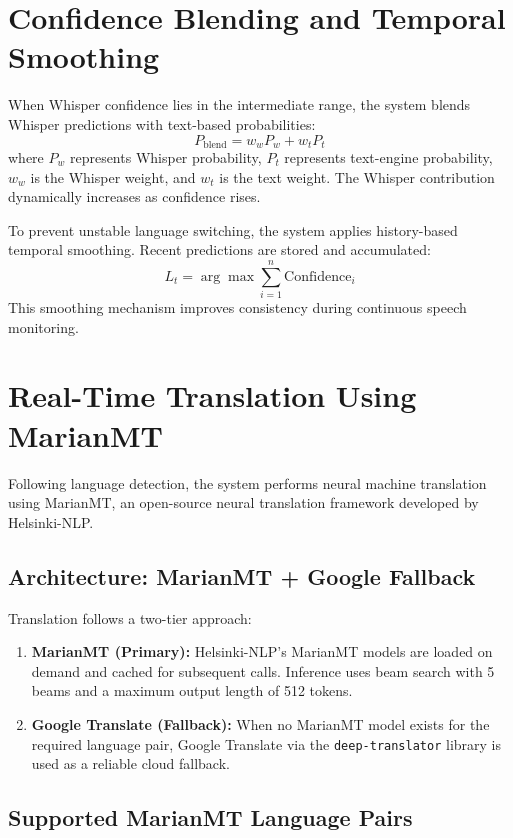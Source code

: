 \documentclass[12pt]{report}
\begin{document}
\section{Confidence Blending and Temporal Smoothing}

When Whisper confidence lies in the intermediate range, the system blends Whisper predictions with text-based probabilities:
\[
P_{\text{blend}} = w_w P_w + w_t P_t
\]
where $P_w$ represents Whisper probability, $P_t$ represents text-engine probability, $w_w$ is the Whisper weight, and $w_t$ is the text weight. The Whisper contribution dynamically increases as confidence rises.

To prevent unstable language switching, the system applies history-based temporal smoothing. Recent predictions are stored and accumulated:
\[
L_t = \arg\max \sum_{i=1}^{n} \text{Confidence}_i
\]
This smoothing mechanism improves consistency during continuous speech monitoring.

\section{Real-Time Translation Using MarianMT}

Following language detection, the system performs neural machine translation using MarianMT, an open-source neural translation framework developed by Helsinki-NLP.

\subsection{Architecture: MarianMT + Google Fallback}
Translation follows a two-tier approach:
\begin{enumerate}
    \item \textbf{MarianMT (Primary):} Helsinki-NLP's MarianMT models are loaded on demand and cached for subsequent calls. Inference uses beam search with 5 beams and a maximum output length of 512 tokens.
    \item \textbf{Google Translate (Fallback):} When no MarianMT model exists for the required language pair, Google Translate via the \texttt{deep-translator} library is used as a reliable cloud fallback.
\end{enumerate}

\subsection{Supported MarianMT Language Pairs}
\end{document}
